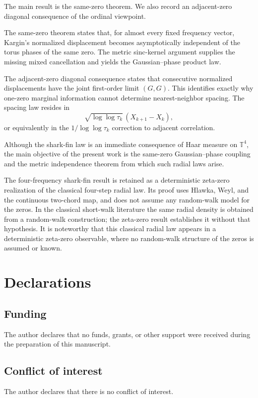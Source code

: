 \documentclass[pdflatex,sn-mathphys-num]{sn-jnl}
\numberwithin{equation}{section}
\theoremstyle{thmstyleone}
\theoremstyle{thmstylethree}
\theoremstyle{thmstyletwo}
\newcommand{\1}{\mathbf 1}
\begin{document}
The main result is the same-zero theorem.  We also record an
adjacent-zero diagonal consequence of the ordinal viewpoint.

The same-zero theorem states that, for almost every fixed frequency vector, Kargin's normalized displacement becomes asymptotically independent of the torus phases of the same zero.  The metric sinc-kernel argument supplies the missing mixed cancellation and yields the Gaussian--phase product law.

The adjacent-zero diagonal consequence states that consecutive normalized displacements have the joint first-order limit $(G,G)$.  This identifies exactly why one-zero marginal information cannot determine nearest-neighbor spacing.  The spacing law resides in
\[
 \sqrt{\log\log\tau_k}\,(X_{k+1}-X_k),
\]
or equivalently in the $1/\log\log\tau_k$ correction to adjacent correlation.

Although the shark-fin law is an immediate consequence of Haar measure on
$\mathbb T^4$, the main objective of the present work is the same-zero
Gaussian--phase coupling and the metric independence theorem from which such
radial laws arise.

The four-frequency shark-fin result is retained as a deterministic
zeta-zero realization of the classical four-step radial law.  Its proof uses
Hlawka, Weyl, and the continuous two-chord map, and does not assume any
random-walk model for the zeros.  In the classical short-walk literature the
same radial density is obtained from a random-walk construction; the zeta-zero
result establishes it without that hypothesis.  It is noteworthy that this
classical radial law appears in a deterministic zeta-zero observable, where no
random-walk structure of the zeros is assumed or known.

\section*{Declarations}

\subsection*{Funding}
The author declares that no funds, grants, or other support were received during the preparation of this manuscript.

\subsection*{Conflict of interest}
The author declares that there is no conflict of interest.
\end{document}
